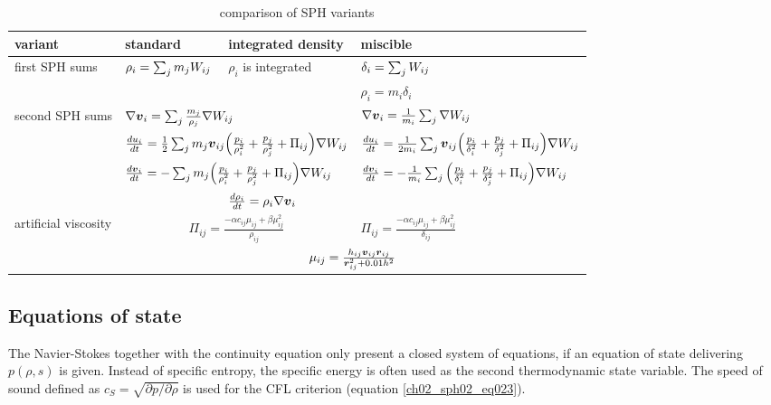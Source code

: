 \begin{landscape}

\begin{table}[htdp]
\begin{center}
\begin{tabular}{|l|l|l|l|}
\hline
variant & standard  & integrated density & miscible \\
\hline \hline
\multirow{2}{3cm}{first SPH sums} & 
\multirow{2}{3cm}{$\rho_i = \sum_{j} m_j W_{ij} $} & 
\multirow{2}{3cm}{$\rho_i$ is integrated }  & 
$ \delta_i = \sum_{j} W_{ij}$ \\
 &
 &
 & 
$\rho_i = m_i \delta_i $ \\
\hline
\multirow{4}{3cm}{second SPH sums} &
\multicolumn{2}{|l|}{$ \nabla \boldsymbol{v}_i = \sum_{j} \frac{m_j}{\rho_j} \nabla W_{ij} $} & 
$ \nabla \boldsymbol{v}_i = \frac{1}{m_i} \sum_{j} \nabla W_{ij} $ \\
& 
\multicolumn{2}{|l|}{$ \frac{du_i}{dt} = \frac{1}{2} \sum_{j} m_{j} \boldsymbol{v}_{ij} \Big( \frac{p_i}{\rho_i^2}  + \frac{p_j}{\rho_j^2} + \Pi_{ij} \Big) \nabla W_{ij} $} & 
$ \frac{du_i}{dt} = \frac{1}{2 m_i} \sum_{j} \boldsymbol{v}_{ij} \Big( \frac{p_i}{\delta_i^2}  + \frac{p_j}{\delta_j^2} + \Pi_{ij} \Big)  \nabla W_{ij} $ \\
& 
\multicolumn{2}{|l|}{$\frac{d \boldsymbol{v}_i }{dt} = - \sum_{j} m_j \Big( \frac{p_i}{\rho_i^2} + \frac{p_j}{\rho_j^2}  +\Pi_{ij} \Big) \nabla W_{ij}$} & 
$\frac{d \boldsymbol{v}_i }{dt} = - \frac{1}{m_i} \sum_{j} \Big( \frac{p_i}{\delta_i^2} + \frac{p_j}{\delta_j^2} + \Pi_{ij} \Big) \nabla W_{ij}$\\
&   
& 
$\frac{d \rho_i}{dt} = \rho_i \nabla \boldsymbol{v}_i$ & \\
\hline
artificial viscosity & \multicolumn{2}{|c|}{$\Pi_{ij} = \frac{- \alpha c_{ij} \mu_{ij} +  \beta \mu_{ij}^2 }{\rho_{ij} } $} & $\Pi_{ij} = \frac{- \alpha c_{ij} \mu_{ij} +  \beta \mu_{ij}^2 }{\delta_{ij} } $ \\
 & \multicolumn{3}{|c|}{$\mu_{ij} = \frac{h_{ij} \boldsymbol{v}_{ij} \boldsymbol{r}_{ij}}{\boldsymbol{r}_{ij}^2+ 0.01h^2} $} \\
\hline
\end{tabular}
\caption{comparison of SPH variants}
\end{center}
\label{default}
\end{table}

\end{landscape}



\subsection{Equations of state}
The Navier-Stokes  together with the continuity equation only present a closed system of equations, if an equation of state delivering $p(\rho, s)$ is given. Instead of specific entropy, the specific energy is often used as the second thermodynamic state variable. The speed of sound defined as $c_S = \sqrt{ \partial p / \partial \rho } $ is used for the CFL criterion (equation \ref{ch02_sph02_eq023}).

